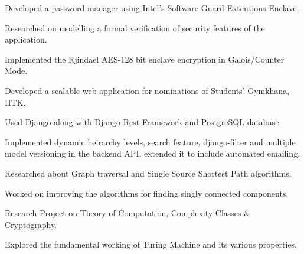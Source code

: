 \documentclass[]{deedy-resume-openfont}
\begin{document}
\begin{minipage}[t]{0.70\textwidth}
\begin{tightemize}
  \item Developed a password manager using Intel's Software Guard Extensions Enclave.
  \item Researched on modelling a formal verification of security features of the application.
  \item Implemented the Rjindael AES-128 bit enclave encryption in Galois/Counter Mode.
\end{tightemize}

\vspace{0.1cm}
\vspace{0cm} %
\begin{tightemize}
  \item Developed a scalable web application for nominations of Students' Gymkhana, IITK.
  \item Used Django along with Django-Rest-Framework and PostgreSQL database.
  \item	Implemented dynamic heirarchy levels, search feature, django-filter and multiple model versioning in the backend API, extended it to include automated emailing.
\end{tightemize}

\vspace{0.1cm}
\begin{tightemize}
  \item Researched about Graph traversal and Single Source Shortest Path algorithms.
  \item Worked on improving the algorithms for finding singly connected components.
\end{tightemize}

\vspace{0.1cm}
\begin{tightemize}
  \item Research Project on Theory of Computation, Complexity Classes \& Cryptography.
  \item Explored the fundamental working of Turing Machine and its various properties.
\end{tightemize}


\end{minipage}
\end{document}
